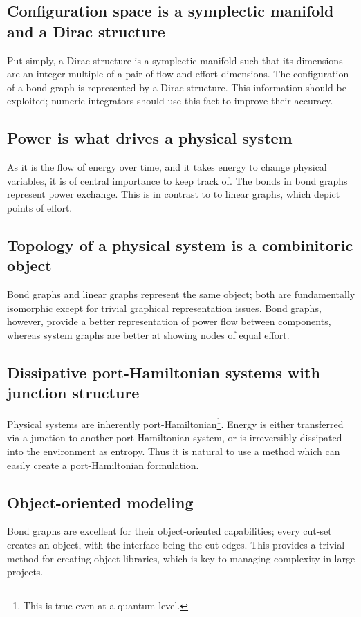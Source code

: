 \documentclass[utf,a4paper,12pt]{report}
\begin{document}
\subsection{Configuration space is a symplectic manifold and a Dirac structure}
Put simply, a Dirac structure is a symplectic manifold such that its dimensions are an integer multiple of a pair of flow and effort dimensions. The configuration of a bond graph is represented by a Dirac structure. This information should be exploited; numeric integrators should use this fact to improve their accuracy. 
\subsection{Power is what drives a physical system}
As it is the flow of energy over time, and it takes energy to change physical variables, it is of central importance to keep track of. The bonds in bond graphs represent power exchange. This is in contrast to to linear graphs, which depict points of effort.
\subsection{Topology of a physical system is a combinitoric object}
Bond graphs and linear graphs represent the same object; both are fundamentally isomorphic except for trivial graphical representation issues. Bond graphs, however, provide a better representation of power flow between components, whereas system graphs are better at showing nodes of equal effort.
\subsection{Dissipative port-Hamiltonian systems with junction structure}
Physical systems are inherently port-Hamiltonian\footnote{This is true even at a quantum level.}. Energy is either transferred via a junction to another port-Hamiltonian system, or is irreversibly dissipated into the environment as entropy. Thus it is natural to use a method which can easily create a port-Hamiltonian formulation.
\subsection{Object-oriented modeling}
Bond graphs are excellent for their object-oriented capabilities; every cut-set creates an object, with the interface being the cut edges. This provides a trivial method for creating object libraries, which is key to managing complexity in large projects.
\end{document}
